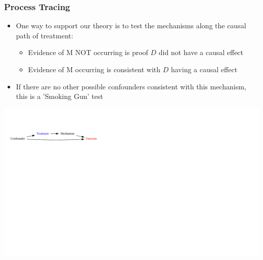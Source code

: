 \documentclass[xcolor=x11names,compress]{beamer}\usepackage[]{graphicx}\usepackage[]{color}
\newenvironment{knitrout}{}{} %
\renewcommand{\(}{\begin{columns}}
\renewcommand{\)}{\end{columns}}
\newcommand{\<}[1]{\begin{column}{#1}}
\renewcommand{\>}{\end{column}}
\begin{document}
\begin{frame}
\frametitle{Process Tracing}
\begin{itemize}
\item One way to support our theory is to test the mechanisms along the causal path of treatment:
\begin{itemize}
\item Evidence of M NOT occurring is proof $D$ did not have a causal effect
\item Evidence of M occurring is consistent with $D$ having a causal effect
\end{itemize}
\item If there are no other possible confounders consistent with this mechanism, this is a 'Smoking Gun' test
\end{itemize}
\begin{knitrout}
\color{fgcolor}
\includegraphics[width=1.8\linewidth]{figure/Dag3b-1} 

\end{knitrout}
\end{frame}
\end{document}
